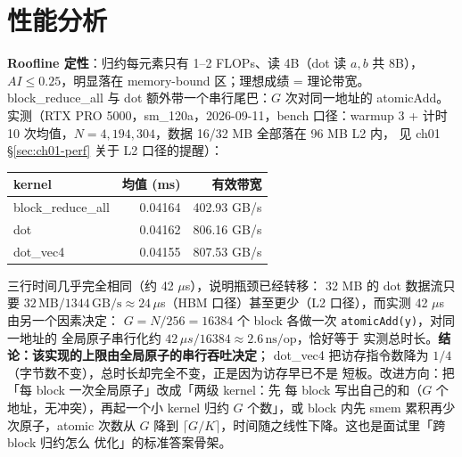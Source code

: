 \section{性能分析}\label{sec:ch02-perf}

\textbf{Roofline 定性}：归约每元素只有 1--2 FLOPs、读 4B（dot 读 $a,b$
共 8B），$AI \le 0.25$，明显落在 memory-bound 区；理想成绩 = 理论带宽。
block\_reduce\_all 与 dot 额外带一个串行尾巴：$G$ 次对同一地址的
atomicAdd。实测（RTX PRO 5000，sm\_120a，2026-09-11，bench 口径：warmup 3
+ 计时 10 次均值，$N = 4{,}194{,}304$，数据 16/32 MB 全部落在 96 MB L2 内，
见 ch01 \S\ref{sec:ch01-perf} 关于 L2 口径的提醒）：

\begin{center}
\begin{tabular}{lrr}
\toprule
kernel & 均值 (ms) & 有效带宽 \\
\midrule
block\_reduce\_all & 0.04164 & 402.93 GB/s \\
dot & 0.04162 & 806.16 GB/s \\
dot\_vec4 & 0.04155 & 807.53 GB/s \\
\bottomrule
\end{tabular}
\end{center}

三行时间几乎完全相同（约 42 $\mu$s），说明瓶颈已经转移：
32 MB 的 dot 数据流只要 $32\,\mathrm{MB} / 1344\,\mathrm{GB/s} \approx
24\,\mu$s（HBM 口径）甚至更少（L2 口径），而实测 42 $\mu$s 由另一个因素决定：
$G = N/256 = 16384$ 个 block 各做一次 \texttt{atomic\allowbreak{}Add\allowbreak{}(y)}，对同一地址的
全局原子串行化约 $42\,\mu s / 16384 \approx 2.6\,\mathrm{ns/op}$，恰好等于
实测总时长。\textbf{结论：该实现的上限由全局原子的串行吞吐决定}；
dot\_vec4 把访存指令数降为 $1/4$（字节数不变），总时长却完全不变，正是因为访存早已不是
短板。改进方向：把「每 block 一次全局原子」改成「两级 kernel：先
每 block 写出自己的和（$G$ 个地址，无冲突），再起一个小 kernel 归约
$G$ 个数」，或 block 内先 smem 累积再少次原子，atomic 次数从 $G$ 降到
$\lceil G/K \rceil$，时间随之线性下降。这也是面试里「跨 block 归约怎么
优化」的标准答案骨架。

